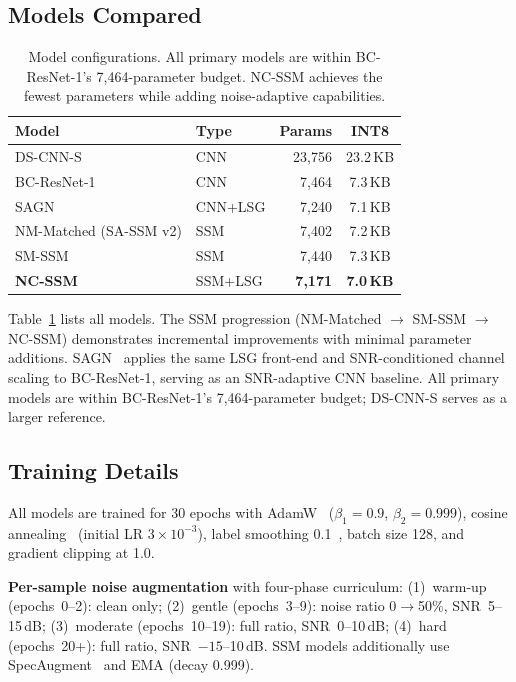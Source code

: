 \documentclass[journal]{IEEEtran}
\begin{document}
\subsection{Models Compared}

\begin{table}[t]
\centering
\caption{Model configurations. All primary models are within BC-ResNet-1's 7{,}464-parameter budget. NC-SSM achieves the fewest parameters while adding noise-adaptive capabilities.}
\label{tab:configs}
\small
\setlength{\tabcolsep}{3pt}
\begin{tabular}{llrc}
\toprule
\textbf{Model} & \textbf{Type} & \textbf{Params} & \textbf{INT8} \\
\midrule
DS-CNN-S~\cite{zhang2017hello} & CNN & 23{,}756 & 23.2\,KB \\
BC-ResNet-1~\cite{kim2021bcresnet} & CNN & 7{,}464 & 7.3\,KB \\
SAGN & CNN+LSG & 7{,}240 & 7.1\,KB \\
\midrule
NM-Matched (SA-SSM v2) & SSM & 7{,}402 & 7.2\,KB \\
SM-SSM & SSM & 7{,}440 & 7.3\,KB \\
\textbf{NC-SSM} & SSM+LSG & \textbf{7{,}171} & \textbf{7.0\,KB} \\
\bottomrule
\end{tabular}
\end{table}

Table~\ref{tab:configs} lists all models. The SSM progression (NM-Matched $\to$ SM-SSM $\to$ NC-SSM) demonstrates incremental improvements with minimal parameter additions.
SAGN~\cite{choi2026nanomamba_interspeech} applies the same LSG front-end and SNR-conditioned channel scaling to BC-ResNet-1, serving as an SNR-adaptive CNN baseline.
All primary models are within BC-ResNet-1's 7{,}464-parameter budget; DS-CNN-S serves as a larger reference.

\subsection{Training Details}

All models are trained for 30 epochs with AdamW~\cite{loshchilov2019adamw} ($\beta_1{=}0.9$, $\beta_2{=}0.999$), cosine annealing~\cite{loshchilov2017sgdr} (initial LR $3{\times}10^{-3}$), label smoothing 0.1~\cite{szegedy2016rethinking}, batch size 128, and gradient clipping at 1.0.

\textbf{Per-sample noise augmentation} with four-phase curriculum:
(1)~warm-up (epochs~0--2): clean only;
(2)~gentle (epochs~3--9): noise ratio 0$\to$50\%, SNR~5--15\,dB;
(3)~moderate (epochs~10--19): full ratio, SNR~0--10\,dB;
(4)~hard (epochs~20+): full ratio, SNR~$-15$--10\,dB.
SSM models additionally use SpecAugment~\cite{park2019specaugment} and EMA (decay 0.999).
\end{document}
